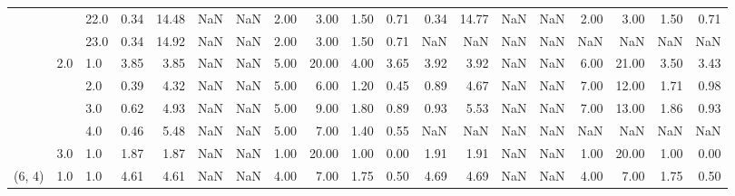 \begin{tabular}{lllrrrrrrrrrrrrrrrr}
       &     & 22.0 &      0.34 &      14.48 &               NaN &                NaN & 2.00 &   3.00 &             1.50 &                         0.71 &      0.34 &      14.77 &               NaN &                NaN & 2.00 &   3.00 &             1.50 &                         0.71 \\
       &     & 23.0 &      0.34 &      14.92 &               NaN &                NaN & 2.00 &   3.00 &             1.50 &                         0.71 &       NaN &        NaN &               NaN &                NaN &  NaN &    NaN &              NaN &                          NaN \\
       & 2.0 & 1.0  &      3.85 &       3.85 &               NaN &                NaN & 5.00 &  20.00 &             4.00 &                         3.65 &      3.92 &       3.92 &               NaN &                NaN & 6.00 &  21.00 &             3.50 &                         3.43 \\
       &     & 2.0  &      0.39 &       4.32 &               NaN &                NaN & 5.00 &   6.00 &             1.20 &                         0.45 &      0.89 &       4.67 &               NaN &                NaN & 7.00 &  12.00 &             1.71 &                         0.98 \\
       &     & 3.0  &      0.62 &       4.93 &               NaN &                NaN & 5.00 &   9.00 &             1.80 &                         0.89 &      0.93 &       5.53 &               NaN &                NaN & 7.00 &  13.00 &             1.86 &                         0.93 \\
       &     & 4.0  &      0.46 &       5.48 &               NaN &                NaN & 5.00 &   7.00 &             1.40 &                         0.55 &       NaN &        NaN &               NaN &                NaN &  NaN &    NaN &              NaN &                          NaN \\
       & 3.0 & 1.0  &      1.87 &       1.87 &               NaN &                NaN & 1.00 &  20.00 &             1.00 &                         0.00 &      1.91 &       1.91 &               NaN &                NaN & 1.00 &  20.00 &             1.00 &                         0.00 \\
(6, 4) & 1.0 & 1.0  &      4.61 &       4.61 &               NaN &                NaN & 4.00 &   7.00 &             1.75 &                         0.50 &      4.69 &       4.69 &               NaN &                NaN & 4.00 &   7.00 &             1.75 &                         0.50 \\

\end{tabular}
